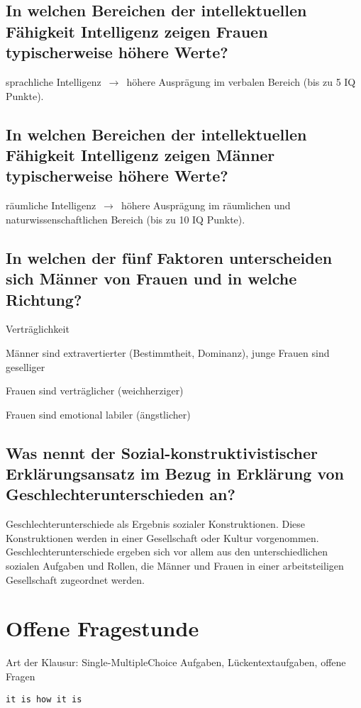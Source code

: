\documentclass[a6paper,9pt,DIV=14]{scrartcl}
\begin{document}
\subsection{In welchen Bereichen der intellektuellen Fähigkeit Intelligenz zeigen Frauen typischerweise höhere Werte?}
sprachliche Intelligenz $\,\to\,$ höhere Ausprägung im verbalen Bereich (bis zu 5 IQ Punkte).
\subsection{In welchen Bereichen der intellektuellen Fähigkeit Intelligenz zeigen Männer typischerweise höhere Werte?}
räumliche Intelligenz $\,\to\,$ höhere Ausprägung im räumlichen und naturwissenschaftlichen Bereich (bis zu 10 IQ Punkte).
\subsection{In welchen der fünf Faktoren unterscheiden sich Männer von Frauen und in welche Richtung?} %
\begin{labeling}{Verträglichkeit}
\item [Extraversion] Männer sind extravertierter (Bestimmtheit, Dominanz), junge Frauen sind geselliger
\item [Verträglichkeit] Frauen sind verträglicher (weichherziger)
\item [Neurotizismus] Frauen sind emotional labiler (ängstlicher)
\end{labeling}
\subsection{Was nennt der Sozial-konstruktivistischer Erklärungsansatz im Bezug in Erklärung von Geschlechterunterschieden an?} %
Geschlechterunterschiede als Ergebnis sozialer Konstruktionen. Diese Konstruktionen werden in einer Gesellschaft oder Kultur vorgenommen. Geschlechterunterschiede ergeben sich vor allem aus den unterschiedlichen sozialen Aufgaben und Rollen, die Männer und Frauen in einer arbeitsteiligen Gesellschaft zugeordnet werden.

\section{Offene Fragestunde}
Art der Klausur:
Single-MultipleChoice Aufgaben, Lückentextaufgaben, offene Fragen


\begin{Verbatim}[samepage=true, frame=single]
it is how it is
\end{Verbatim}
\end{document}
